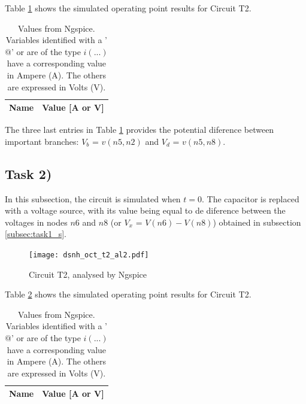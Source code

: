Table \ref{tab:op1} shows the simulated operating point results for Circuit T2.

\begin{table}[ht]
	\centering
	\begin{tabular}{|l|r|}
		\hline    
		{\bf Name} & {\bf Value [A or V]} \\ \hline
    		
	\end{tabular}
	
	\caption{Values from Ngspice. Variables identified with a '$@$' or are of the type
	$i(...)$ have a corresponding value in Ampere (A). The others are expressed in Volts (V).}
    
\label{tab:op1}
\end{table}

The three last entries in Table \ref{tab:op1} provides the potential diference between important
branches: $V_b$ = $v(n5,n2)$ and $V_d$ = $v(n5,n8)$.


\subsection{Task 2)}
\label{subsec:task2_s}


In this subsection, the circuit is simulated when $t=0$. The capacitor is replaced with a voltage source, 
with its value being equal to de diference between the voltages in nodes $n6$ and $n8$ (or $V_x$ = $V(n6)-
V(n8)$) obtained in subsection \ref{subsec:task1_s}.

\begin{figure}[ht]
	\centering
	\texttt{[image: dsnh\_oct\_t2\_al2.pdf]}
	\caption{Circuit T2, analysed by Ngspice}
\label{fig:Dsnh_sim_t2}
\end{figure}

Table \ref{tab:op2} shows the simulated operating point results for Circuit T2.

\begin{table}[ht]
	\centering
	\begin{tabular}{|l|r|}
		\hline    
		{\bf Name} & {\bf Value [A or V]} \\ \hline
    		
	\end{tabular}
	
	\caption{Values from Ngspice. Variables identified with a '$@$' or are of the type
	$i(...)$ have a corresponding value in Ampere (A). The others are expressed in Volts (V).}
    
\label{tab:op2}
\end{table}


